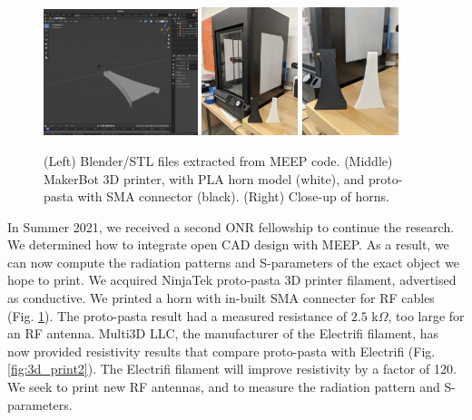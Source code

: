 \documentclass[10pt]{amsart}
\theoremstyle{definition}
\numberwithin{equation}{section}
\begin{document}
\begin{figure}
\centering
\includegraphics[width=0.4\textwidth]{figures/blender_example.png}
\includegraphics[width=0.25\textwidth]{figures/3dprinter.jpg}
\includegraphics[width=0.25\textwidth]{figures/3dprinter_2.jpg}
\caption{\label{fig:3d_print} (Left) Blender/STL files extracted from MEEP code.  (Middle) MakerBot 3D printer, with PLA horn model (white), and  proto-pasta with SMA connector (black). (Right) Close-up of horns.}
\end{figure}

In Summer 2021, we received a second ONR fellowship to continue the research.  We determined how to integrate open CAD design with MEEP.  As a result, we can now compute the radiation patterns and S-parameters of the exact object we hope to print.  We acquired NinjaTek proto-pasta 3D printer filament, advertised as conductive.  We printed a horn with in-built SMA connecter for RF cables (Fig. \ref{fig:3d_print}).  The proto-pasta result had a measured resistance of $2.5$ k$\Omega$, too large for an RF antenna.  Multi3D LLC, the manufacturer of the Electrifi filament, has now provided resistivity results that compare proto-pasta with Electrifi (Fig. \ref{fig:3d_print2}).  The Electrifi filament will improve resistivity by a factor of 120.  We seek to print new RF antennas, and to measure the radiation pattern and S-parameters. 
\end{document}

